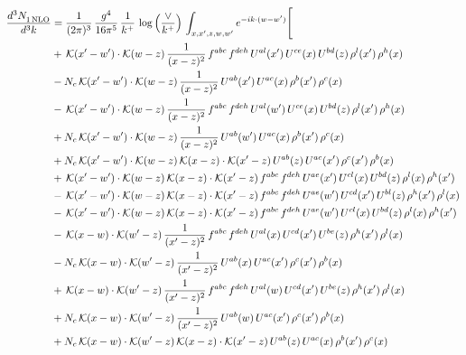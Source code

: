 \documentclass[9pt]{article}
\numberwithin{equation}{section}
\begin{document}
\begin{align}
    \frac{d^{3}N_{1\,\rm NLO}^{\rm}}{d^{3}k}  & = \frac{1}{(2\pi)^{3}}\,\frac{g^{4}}{16\pi^{5}}\,\frac{1}{k^{+}}\,\log{\left(\frac{\vee}{k^{+}}\right)}\, \int_{x,x',z,w,w'}e^{-ik\cdot (w-w')}\Bigg[\notag\\ & +\,\mathcal{K}(x'-w')\cdot\mathcal{K}(w-z)\,\frac{1}{(x-z)^{2}}\,f^{abc}\,f^{deh}\,U^{al}(x')\,U^{ce}(x)\,U^{bd}(z)\,\rho^{l}(x')\,\rho^{h}(x)\notag \\ 
&-N_{c}\,\mathcal{K}(x'-w')\cdot\mathcal{K}(w-z)\,\frac{1}{(x-z)^{2}}\,U^{ab}(x')\,U^{ac}(x)\,\rho^{b}(x')\,\rho^{c}(x)\notag \\ 
&-\,\mathcal{K}(x'-w')\cdot\mathcal{K}(w-z)\,\frac{1}{(x-z)^{2}}\,f^{abc}\,f^{deh}\,U^{al}(w')\,U^{ce}(x)\,U^{bd}(z)\,\rho^{l}(x')\,\rho^{h}(x)\notag \\ 
&+N_{c}\,\mathcal{K}(x'-w')\cdot\mathcal{K}(w-z)\,\frac{1}{(x-z)^{2}}\,U^{ab}(w')\,U^{ac}(x)\,\rho^{b}(x')\,\rho^{c}(x)\notag \\ 
&+N_{c}\,\mathcal{K}(x'-w')\cdot\mathcal{K}(w-z)\,\mathcal{K}(x-z)\cdot\mathcal{K}(x'-z)\,U^{ab}(z)\,U^{ac}(x')\,\rho^{c}(x')\,\rho^{b}(x)\notag \\ 
&+\,\mathcal{K}(x'-w')\cdot\mathcal{K}(w-z)\,\mathcal{K}(x-z)\cdot\mathcal{K}(x'-z)\,f^{abc}\,f^{deh}\,U^{ae}(x')\,U^{cl}(x)\,U^{bd}(z)\,\rho^{l}(x)\,\rho^{h}(x')\notag \\ 
&-\,\mathcal{K}(x'-w')\cdot\mathcal{K}(w-z)\,\mathcal{K}(x-z)\cdot\mathcal{K}(x'-z)\,f^{abc}\,f^{deh}\,U^{ae}(w')\,U^{cd}(x')\,U^{bl}(z)\,\rho^{h}(x')\,\rho^{l}(x)\notag \\ 
&-\,\mathcal{K}(x'-w')\cdot\mathcal{K}(w-z)\,\mathcal{K}(x-z)\cdot\mathcal{K}(x'-z)\,f^{abc}\,f^{deh}\,U^{ae}(w')\,U^{cl}(x)\,U^{bd}(z)\,\rho^{l}(x)\,\rho^{h}(x')\notag \\ 
&-\,\mathcal{K}(x-w)\cdot\mathcal{K}(w'-z)\,\frac{1}{(x'-z)^{2}}\,f^{abc}\,f^{deh}\,U^{al}(x)\,U^{cd}(x')\,U^{be}(z)\,\rho^{h}(x')\,\rho^{l}(x)\notag \\ 
&-N_{c}\,\mathcal{K}(x-w)\cdot\mathcal{K}(w'-z)\,\frac{1}{(x'-z)^{2}}\,U^{ab}(x)\,U^{ac}(x')\,\rho^{c}(x')\,\rho^{b}(x)\notag \\ 
&+\,\mathcal{K}(x-w)\cdot\mathcal{K}(w'-z)\,\frac{1}{(x'-z)^{2}}\,f^{abc}\,f^{deh}\,U^{al}(w)\,U^{cd}(x')\,U^{be}(z)\,\rho^{h}(x')\,\rho^{l}(x)\notag \\ 
&+N_{c}\,\mathcal{K}(x-w)\cdot\mathcal{K}(w'-z)\,\frac{1}{(x'-z)^{2}}\,U^{ab}(w)\,U^{ac}(x')\,\rho^{c}(x')\,\rho^{b}(x)\notag \\ 
&+N_{c}\,\mathcal{K}(x-w)\cdot\mathcal{K}(w'-z)\,\mathcal{K}(x-z)\cdot\mathcal{K}(x'-z)\,U^{ab}(z)\,U^{ac}(x)\,\rho^{b}(x')\,\rho^{c}(x)\notag \\ 

\end{align}
\end{document}
